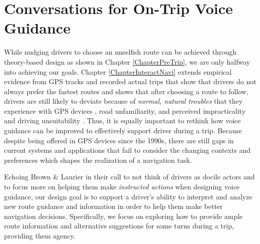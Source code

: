 \chapter{Conversations for On-Trip Voice Guidance}
\label{ChapterConversations}

While nudging drivers to choose an unselfish route can be achieved through theory-based design as shown in Chapter \ref{ChapterPreTrip}, we are only halfway into achieving our goals. Chapter \ref{ChapterInteractNavi} extends empirical evidence from GPS tracks and recorded actual trips that show that drivers do not always prefer the fastest routes \cite{Quercia2014, Zhu2015DoPrinciple,Tang2016AnalyzingData,Fujino2018DetectingTracks,Brown2012TheGPS,Samson:2019:EFI:3290605.3300601} and shows that after choosing a route to follow, drivers are still likely to deviate because of \emph{normal, natural troubles} that they experience with GPS devices \cite{Brown2012TheGPS}, road unfamiliarity, and perceived impracticality and driving unsuitability \cite{Samson:2019:EFI:3290605.3300601}. Thus, it is equally important to rethink how voice guidance can be improved to effectively support driver during a trip. Because despite being offered in GPS devices since the 1990s, there are still gaps in current systems and applications that fail to consider the changing contexts and preferences which shapes the realization of a navigation task. 

Echoing Brown \& Laurier \cite{Brown2012TheGPS} in their call to not think of drivers as docile actors and to focus more on helping them make \textit{instructed actions} when designing voice guidance, our design goal is to support a driver's ability to interpret and analyze new route guidance and information in order to help them make better navigation decisions. Specifically, we focus on exploring how to provide ample route information and alternative suggestions for some turns during a trip, providing them agency.

